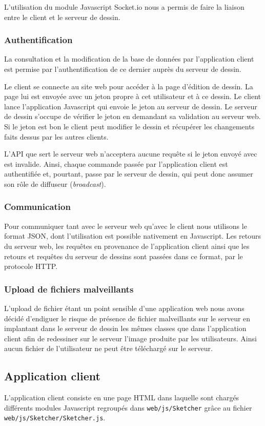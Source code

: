 \documentclass[a4paper]{article}
\begin{document}
L'utilisation du module Javascript Socket.io nous a permis de faire la liaison entre le client et le serveur de dessin.

\subsubsection{Authentification}
La consultation et la modification de la base de données par l'application client est permise par l'authentification de ce dernier auprès du serveur de dessin.

Le client se connecte au site web pour accéder à la page d'édition de dessin. La page lui est envoyée avec un jeton propre à cet utilisateur et à ce dessin. Le client lance l'application Javascript qui envoie le jeton au serveur de dessin. Le serveur de dessin s'occupe de vérifier le jeton en demandant sa validation au serveur web. Si le jeton est bon le client peut modifier le dessin et récupérer les changements faits dessus par les autres clients.

L'API que sert le serveur web n'acceptera aucune requête si le jeton envoyé avec est invalide. Ainsi, chaque commande passée par l'application client est authentifiée et, pourtant, passe par le serveur de dessin, qui peut donc assumer son rôle de diffuseur (\textit{broadcast}).

\subsubsection{Communication}
Pour communiquer tant avec le serveur web qu'avec le client nous utilisons le format JSON, dont l'utilisation est possible nativement en Javascript. Les retours du serveur web, les requêtes en provenance de l'application client ainsi que les retours et requêtes du serveur de dessins sont passées dans ce format, par le protocole HTTP.

\subsubsection{Upload de fichiers malveillants}
L'upload de fichier étant un point sensible d'une application web nous avons décidé d'endiguer le risque de présence de fichier malveillants sur le serveur en implantant dans le serveur de dessin les mêmes classes que dans l'application client afin de redessiner sur le serveur l'image produite par les utilisateurs. Ainsi aucun fichier de l'utilisateur ne peut être téléchargé sur le serveur.

\subsection{Application client}
L'application client consiste en une page HTML dans laquelle sont chargés différents modules Javascript regroupés dans \texttt{web/js/Sketcher} grâce au fichier \texttt{web/js/Sketcher/Sketcher.js}.
\end{document}
